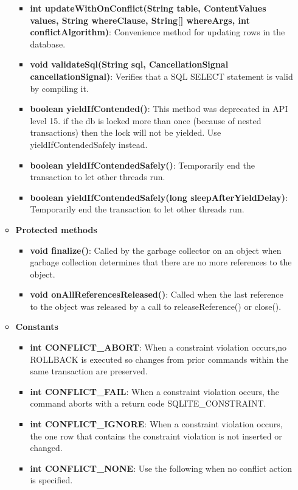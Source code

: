 \documentclass{report}
\begin{document}
\begin{itemize}
\begin{itemize}
\begin{itemize}
                \item \textbf{int	updateWithOnConflict(String table, ContentValues values, String whereClause, String[] whereArgs, int conflictAlgorithm)}: Convenience method for updating rows in the database.
                \item \textbf{void	validateSql(String sql, CancellationSignal cancellationSignal)}: Verifies that a SQL SELECT statement is valid by compiling it.
                \item \textbf{boolean	yieldIfContended()}: This method was deprecated in API level 15. if the db is locked more than once (because of nested transactions) then the lock will not be yielded. Use yieldIfContendedSafely instead.
                \item \textbf{boolean	yieldIfContendedSafely()}: Temporarily end the transaction to let other threads run.
                \item \textbf{boolean	yieldIfContendedSafely(long sleepAfterYieldDelay)}: Temporarily end the transaction to let other threads run.
            \end{itemize}
        \item \textbf{Protected methods}
            \begin{itemize}
                \item \textbf{void	finalize()}: Called by the garbage collector on an object when garbage collection determines that there are no more references to the object.
                \item \textbf{void	onAllReferencesReleased()}: Called when the last reference to the object was released by a call to releaseReference() or close().
            \end{itemize}
        \item \textbf{Constants}
            \begin{itemize}
                \item \textbf{int	CONFLICT\_ABORT}: When a constraint violation occurs,no ROLLBACK is executed so changes from prior commands within the same transaction are preserved.
                \item \textbf{int	CONFLICT\_FAIL}: When a constraint violation occurs, the command aborts with a return code SQLITE\_CONSTRAINT.
                \item \textbf{int	CONFLICT\_IGNORE}: When a constraint violation occurs, the one row that contains the constraint violation is not inserted or changed.
                \item \textbf{int	CONFLICT\_NONE}: Use the following when no conflict action is specified.

\end{itemize}
\end{itemize}
\end{itemize}
\end{document}
